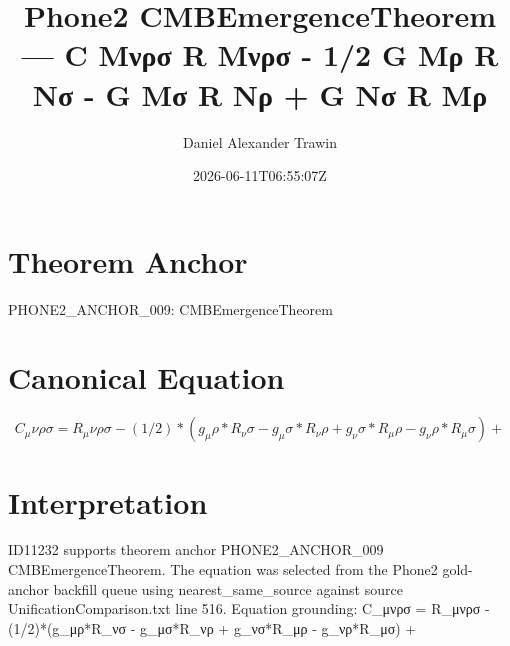 \documentclass[11pt]{article}
\title{Phone2 CMBEmergenceTheorem — C Μνρσ R Μνρσ - 1/2 G Μρ R Νσ - G Μσ R Νρ + G Νσ R Μρ}
\author{Daniel Alexander Trawin}
\date{2026-06-11T06:55:07Z}
\begin{document}
\maketitle
\section*{Theorem Anchor}
PHONE2_ANCHOR_009: CMBEmergenceTheorem
\section*{Canonical Equation}
\[
C_μνρσ = R_μνρσ - (1/2)*(g_μρ*R_νσ - g_μσ*R_νρ + g_νσ*R_μρ - g_νρ*R_μσ) +
\]
\section*{Interpretation}
ID11232 supports theorem anchor PHONE2_ANCHOR_009 CMBEmergenceTheorem. The equation was selected from the Phone2 gold-anchor backfill queue using nearest_same_source against source UnificationComparison.txt line 516. Equation grounding: C_μνρσ = R_μνρσ - (1/2)*(g_μρ*R_νσ - g_μσ*R_νρ + g_νσ*R_μρ - g_νρ*R_μσ) +
\end{document}
